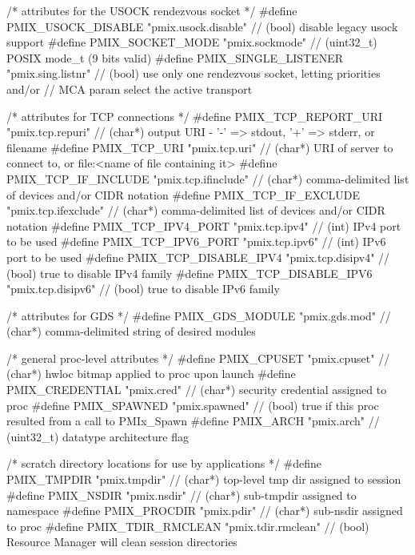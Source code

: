 \begin{codepar}
/* attributes for the USOCK rendezvous socket  */
#define PMIX_USOCK_DISABLE                  "pmix.usock.disable"    // (bool) disable legacy usock support
#define PMIX_SOCKET_MODE                    "pmix.sockmode"         // (uint32_t) POSIX mode_t (9 bits valid)
#define PMIX_SINGLE_LISTENER                "pmix.sing.listnr"      // (bool) use only one rendezvous socket, letting priorities and/or
                                                                    //        MCA param select the active transport

/* attributes for TCP connections */
#define PMIX_TCP_REPORT_URI                 "pmix.tcp.repuri"       // (char*) output URI - '-' => stdout, '+' => stderr, or filename
#define PMIX_TCP_URI                        "pmix.tcp.uri"          // (char*) URI of server to connect to, or file:<name of file containing it>
#define PMIX_TCP_IF_INCLUDE                 "pmix.tcp.ifinclude"    // (char*) comma-delimited list of devices and/or CIDR notation
#define PMIX_TCP_IF_EXCLUDE                 "pmix.tcp.ifexclude"    // (char*) comma-delimited list of devices and/or CIDR notation
#define PMIX_TCP_IPV4_PORT                  "pmix.tcp.ipv4"         // (int) IPv4 port to be used
#define PMIX_TCP_IPV6_PORT                  "pmix.tcp.ipv6"         // (int) IPv6 port to be used
#define PMIX_TCP_DISABLE_IPV4               "pmix.tcp.disipv4"      // (bool) true to disable IPv4 family
#define PMIX_TCP_DISABLE_IPV6               "pmix.tcp.disipv6"      // (bool) true to disable IPv6 family

/* attributes for GDS */
#define PMIX_GDS_MODULE                     "pmix.gds.mod"          // (char*) comma-delimited string of desired modules

/* general proc-level attributes */
#define PMIX_CPUSET                         "pmix.cpuset"           // (char*) hwloc bitmap applied to proc upon launch
#define PMIX_CREDENTIAL                     "pmix.cred"             // (char*) security credential assigned to proc
#define PMIX_SPAWNED                        "pmix.spawned"          // (bool) true if this proc resulted from a call to PMIx_Spawn
#define PMIX_ARCH                           "pmix.arch"             // (uint32_t) datatype architecture flag

/* scratch directory locations for use by applications */
#define PMIX_TMPDIR                         "pmix.tmpdir"           // (char*) top-level tmp dir assigned to session
#define PMIX_NSDIR                          "pmix.nsdir"            // (char*) sub-tmpdir assigned to namespace
#define PMIX_PROCDIR                        "pmix.pdir"             // (char*) sub-nsdir assigned to proc
#define PMIX_TDIR_RMCLEAN                   "pmix.tdir.rmclean"     // (bool)  Resource Manager will clean session directories


\end{codepar}
